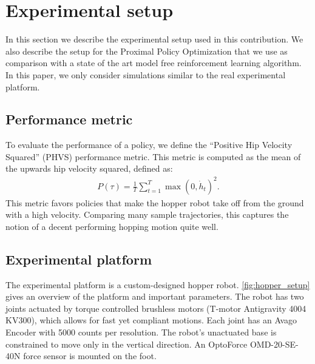\section{Experimental setup}
\label{sec:experiments}
%
In this section we describe the experimental setup used in this contribution. We also describe the setup
for the Proximal Policy Optimization \cite{schulman2017proximal}
that we use as comparison with a state of the art model free reinforcement
learning algorithm. In this paper, we only
consider simulations similar to the real experimental platform.
%
%
%
%
%
\subsection{Performance metric}
To evaluate the performance of a policy, we define the ``Positive Hip Velocity Squared'' (PHVS) performance metric. This metric is computed as the mean of the upwards hip velocity squared, defined as:
%
\begin{align}
  \label{eq:policy_perf_metric}
  P(\tau) = \frac{1}{T} \sum_{t=1}^{T} \max(0, \dot{h}_t)^2.
\end{align}
%
This metric favors policies that make the hopper robot take off from the ground with a high velocity. Comparing many sample trajectories, this captures the notion of a decent performing hopping motion quite well.
%
\subsection{Experimental platform}
\label{sec:exp_setup}
%
The experimental platform is a custom-designed hopper robot. \cref{fig:hopper_setup} gives
an overview of the platform and important parameters.
The robot has two joints actuated by torque controlled brushless motors (T-motor Antigravity 4004 KV300), which allows for fast yet compliant motions. Each joint has an Avago Encoder with 5000 counts per resolution. The robot's unactuated base is constrained to move only in the vertical direction. An OptoForce OMD-20-SE-40N force sensor is mounted on the foot.

